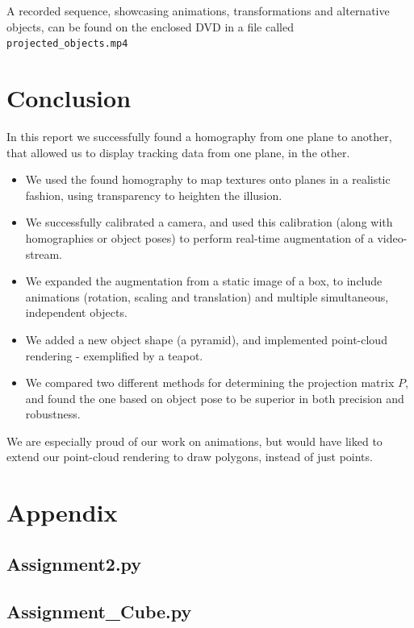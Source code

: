 \documentclass[a4paper,11pt]{article}
\begin{document}
A recorded sequence, showcasing animations, transformations and alternative objects, can be found on the enclosed DVD in a file called \texttt{projected\_objects.mp4}

\section{Conclusion}
In this report we successfully found a homography from one plane to another, that allowed us to display tracking data from one plane, in the other.
\begin{itemize}
\item
We used the found homography to map textures onto planes in a realistic fashion, using transparency to heighten the illusion.
\item
We successfully calibrated a camera, and used this calibration (along with homographies or object poses) to perform real-time augmentation of a video-stream.
\item
We expanded the augmentation from a static image of a box, to include animations (rotation, scaling and translation) and multiple simultaneous, independent objects.
\item
We added a new object shape (a pyramid), and implemented point-cloud rendering - exemplified by a teapot.
\item
We compared two different methods for determining the projection matrix $P$, and found the one based on object pose to be superior in both precision and robustness.
\end{itemize}
We are especially proud of our work on animations, but would have liked to extend our point-cloud rendering to draw polygons, instead of just points.

\newpage
\section*{Appendix}
\subsection*{Assignment2.py}

\subsection*{Assignment\_Cube.py}

\end{document}
